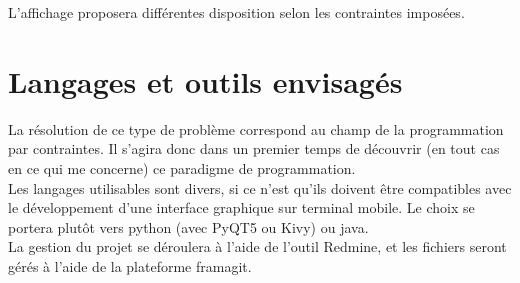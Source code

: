 \documentclass{scrartcl}
\begin{document}
    L'affichage proposera différentes disposition selon les contraintes imposées.


    \section{Langages et outils envisagés}

    La résolution de ce type de problème correspond au champ de la programmation par contraintes. Il s'agira donc 
    dans un premier temps de découvrir (en tout cas en ce qui me concerne) ce paradigme de programmation.\\

    Les langages utilisables sont divers, si ce n'est qu'ils doivent être compatibles
    avec le développement d'une interface graphique sur terminal mobile.
    Le choix se portera plutôt vers python (avec PyQT5 ou Kivy) ou java.\\

    La gestion du projet se déroulera à l'aide de l'outil Redmine, et les fichiers seront gérés à l'aide de la plateforme framagit.
\end{document}
